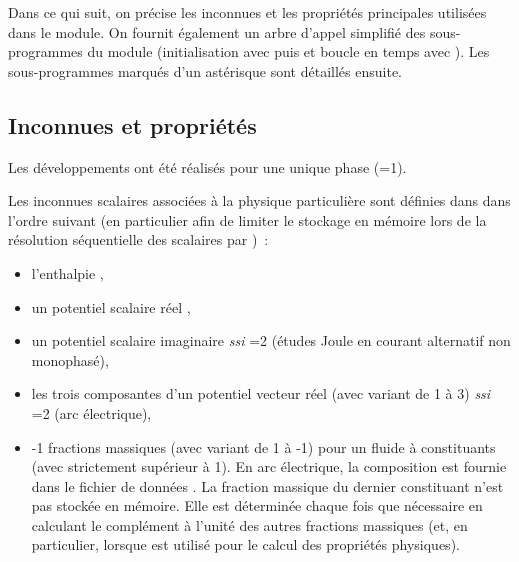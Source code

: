 Dans ce qui suit, on pr\'ecise les inconnues et les propri\'et\'es
principales utilis\'ees dans le module. 
On fournit \'egalement un arbre d'appel simplifi\'e des sous-programmes du module
(initialisation avec  puis  et boucle en temps avec ). 
Les sous-programmes marqu\'es d'un ast\'erisque sont d\'etaill\'es ensuite. 

\newpage 

\subsection{Inconnues et propri\'et\'es} 

Les d\'eveloppements ont \'et\'e r\'ealis\'es pour une unique phase (=1). 
 
Les  inconnues scalaires associ\'ees \`a la physique
particuli\`ere sont d\'efinies dans  dans l'ordre
suivant (en particulier afin de limiter le stockage en m\'emoire lors de
la r\'esolution s\'equentielle des
scalaires par )~:
\begin{itemize} 
\item l'enthalpie , 
\item un potentiel scalaire r\'eel , 
\item un potentiel scalaire imaginaire  {\it ssi}
  	=2 (\'etudes Joule en courant alternatif non monophas\'e),
\item les trois composantes d'un potentiel vecteur r\'eel
  	 (avec  variant de 1 \`a 3) {\it ssi}
	=2 (arc \'electrique),
\item {}-1 fractions massiques  
	(avec  variant de 1 \`a -1) pour un fluide \`a 
	constituants (avec  strictement sup\'erieur \`a 1). 
	En arc \'electrique, la composition est fournie dans le fichier de donn\'ees
	. La fraction massique du
	dernier constituant n'est pas stock\'ee en m\'emoire. Elle est
	d\'etermin\'ee chaque fois que n\'ecessaire en calculant le compl\'ement \`a l'unit\'e
	des autres fractions massiques (et, en particulier, lorsque  est
	utilis\'e pour le calcul des propri\'et\'es physiques). 
\end{itemize}

